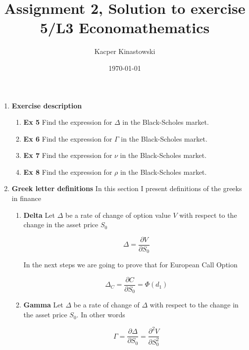 \documentclass[12pt]{article}
\title{Assignment 2, Solution to exercise 5/L3 Economathematics}
\author{Kacper Kinastowski}
\date{\today}
\begin{document}
\maketitle
\begin{enumerate}[leftmargin=\labelsep]

\item \textbf{Exercise description} 

\begin{enumerate}
    \item \textbf{Ex 5} Find the expression for $\Delta$ in the Black-Scholes market.

    \item \textbf{Ex 6} Find the expression for $\Gamma$ in the Black-Scholes market.

    \item \textbf{Ex 7} Find the expression for $\nu$ in the Black-Scholes market.

    \item \textbf{Ex 8} Find the expression for $\rho$ in the Black-Scholes market.
\end{enumerate}

\item \textbf{Greek letter definitions} In this section I present definitions of the greeks in finance \cite{Yu2013OnDO}

\begin{enumerate}
    \item \textbf{Delta} Let $\Delta$ be a rate of change of option value $V$ with respect to the change in the asset price $S_0$

    \begin{equation}
        \Delta = \frac{\partial V}{\partial S_0}
    \end{equation}
    
    In the next steps we are going to prove that for European Call Option
    
    \begin{equation}
        \Delta_C = \frac{\partial C}{\partial S_0} = \Phi(d_1)
    \end{equation}

    \item \textbf{Gamma} Let $\Delta$ be a rate of change of $\Delta$ with respect to the change in the asset price $S_0$. In other words

    \begin{equation}
        \Gamma = \frac{\partial \Delta}{\partial S_0} 
        = \frac{\partial^2 V}{\partial S_0^2}
    \end{equation}


\end{enumerate}
\end{enumerate}
\end{document}

